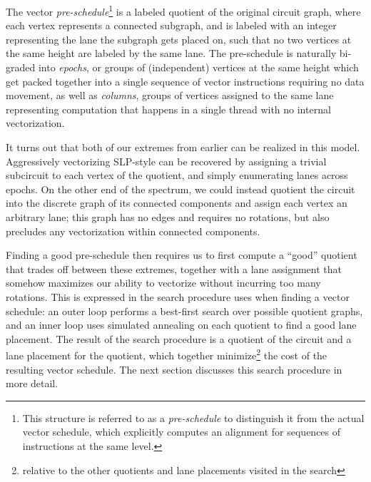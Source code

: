 The vector {\em pre-schedule}\footnote{This structure is referred to as a {\em pre-schedule} to distinguish it from the actual vector schedule, which explicitly computes an alignment for sequences of instructions at the same level. %
} is a labeled quotient of the original circuit graph, where each vertex represents a connected subgraph, and is labeled with an integer representing the lane the subgraph gets placed on, such that no two vertices at the same height are labeled by the same lane.
The pre-schedule is naturally bi-graded into {\em epochs}, or groups of (independent) vertices at the same height which get packed together into a single sequence of vector instructions requiring no data movement, as well as {\em columns}, groups of vertices assigned to the same lane representing computation that happens in a single thread with no internal vectorization.

It turns out that both of our extremes from earlier can be realized in this model.
Aggressively vectorizing SLP-style can be recovered by assigning a trivial subcircuit to each vertex of the quotient, and simply enumerating lanes across epochs.
On the other end of the spectrum, we could instead quotient the circuit into the discrete graph of its connected components and assign each vertex an arbitrary lane; this graph has no edges and requires no rotations, but also precludes any vectorization within connected components.

Finding a good pre-schedule then requires us to first compute a ``good'' quotient that trades off between these extremes, together with a lane assignment that somehow maximizes our ability to vectorize without incurring too many rotations.
This is expressed in the search procedure {\system} uses when finding a vector schedule: an outer loop performs a best-first search over possible quotient graphs, and an inner loop uses simulated annealing on each quotient to find a good lane placement.
The result of the search procedure is a quotient of the circuit and a lane placement for the quotient, which together minimize\footnote{relative to the other quotients and lane placements visited in the search} the cost of the resulting vector schedule. %
The next section discusses this search procedure in more detail.

